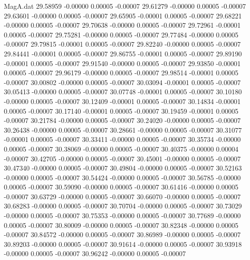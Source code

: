 \begin{filecontents}{MagA.dat}
  29.58959   -0.00000    0.00005   -0.00007
  29.61279   -0.00000    0.00005   -0.00007
  29.63601   -0.00000    0.00005   -0.00007
  29.65905   -0.00001    0.00005   -0.00007
  29.68221   -0.00000    0.00005   -0.00007
  29.70638   -0.00000    0.00005   -0.00007
  29.72961   -0.00001    0.00005   -0.00007
  29.75281   -0.00000    0.00005   -0.00007
  29.77484   -0.00000    0.00005   -0.00007
  29.79815   -0.00001    0.00005   -0.00007
  29.82240   -0.00000    0.00005   -0.00007
  29.84441   -0.00001    0.00005   -0.00007
  29.86755   -0.00001    0.00005   -0.00007
  29.89190   -0.00001    0.00005   -0.00007
  29.91540   -0.00000    0.00005   -0.00007
  29.93850   -0.00001    0.00005   -0.00007
  29.96179   -0.00000    0.00005   -0.00007
  29.98514   -0.00001    0.00005   -0.00007
  30.00802   -0.00000    0.00005   -0.00007
  30.03094   -0.00001    0.00005   -0.00007
  30.05413   -0.00000    0.00005   -0.00007
  30.07748   -0.00001    0.00005   -0.00007
  30.10180   -0.00000    0.00005   -0.00007
  30.12409   -0.00001    0.00005   -0.00007
  30.14834   -0.00001    0.00005   -0.00007
  30.17140   -0.00001    0.00005   -0.00007
  30.19459   -0.00001    0.00005   -0.00007
  30.21784   -0.00000    0.00005   -0.00007
  30.24020   -0.00000    0.00005   -0.00007
  30.26438   -0.00000    0.00005   -0.00007
  30.28661   -0.00000    0.00005   -0.00007
  30.31077   -0.00001    0.00005   -0.00007
  30.33411   -0.00000    0.00005   -0.00007
  30.35734   -0.00000    0.00005   -0.00007
  30.38069   -0.00000    0.00005   -0.00007
  30.40375   -0.00000    0.00004   -0.00007
  30.42705   -0.00000    0.00005   -0.00007
  30.45001   -0.00000    0.00005   -0.00007
  30.47340   -0.00000    0.00005   -0.00007
  30.49804   -0.00000    0.00005   -0.00007
  30.52163   -0.00000    0.00005   -0.00007
  30.54424   -0.00000    0.00005   -0.00007
  30.56785   -0.00000    0.00005   -0.00007
  30.59090   -0.00000    0.00005   -0.00007
  30.61416   -0.00000    0.00005   -0.00007
  30.63729   -0.00000    0.00005   -0.00007
  30.66070   -0.00000    0.00005   -0.00007
  30.68283   -0.00000    0.00005   -0.00007
  30.70704   -0.00000    0.00005   -0.00007
  30.73029   -0.00000    0.00005   -0.00007
  30.75353   -0.00000    0.00005   -0.00007
  30.77689   -0.00000    0.00005   -0.00007
  30.80009   -0.00000    0.00005   -0.00007
  30.82348   -0.00000    0.00005   -0.00007
  30.84572   -0.00000    0.00005   -0.00007
  30.86989   -0.00000    0.00005   -0.00007
  30.89203   -0.00000    0.00005   -0.00007
  30.91614   -0.00000    0.00005   -0.00007
  30.93918   -0.00000    0.00005   -0.00007
  30.96242   -0.00000    0.00005   -0.00007

\end{filecontents}
